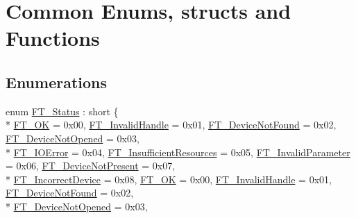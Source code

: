 \hypertarget{group___common}{}\section{Common Enums, structs and Functions}
\label{group___common}
\subsection*{Enumerations}
\begin{DoxyCompactItemize}
\item 
enum \hyperlink{group___common_ga9de42f4b466f017bd6daf4e230259f63}{F\+T\+\_\+\+Status} \+: short \{ \\*
\hyperlink{group___common_gga9de42f4b466f017bd6daf4e230259f63a57771796d33c3f4178130c5daa56b9a3}{F\+T\+\_\+\+OK} = 0x00, 
\hyperlink{group___common_gga9de42f4b466f017bd6daf4e230259f63ac239cf0d929347a453a8c101dc92e807}{F\+T\+\_\+\+Invalid\+Handle} = 0x01, 
\hyperlink{group___common_gga9de42f4b466f017bd6daf4e230259f63ae9964600bb851f34b23a83b24b2e6da2}{F\+T\+\_\+\+Device\+Not\+Found} = 0x02, 
\hyperlink{group___common_gga9de42f4b466f017bd6daf4e230259f63aceb643842b51d1133483c713d15457dd}{F\+T\+\_\+\+Device\+Not\+Opened} = 0x03, 
\\*
\hyperlink{group___common_gga9de42f4b466f017bd6daf4e230259f63a51deb65a356d1b1c0e90f62404efcc29}{F\+T\+\_\+\+I\+O\+Error} = 0x04, 
\hyperlink{group___common_gga9de42f4b466f017bd6daf4e230259f63a6af4fbc8e683431beb65cce312c32fa1}{F\+T\+\_\+\+Insufficient\+Resources} = 0x05, 
\hyperlink{group___common_gga9de42f4b466f017bd6daf4e230259f63af677e4e362188f7700de9148a19f3191}{F\+T\+\_\+\+Invalid\+Parameter} = 0x06, 
\hyperlink{group___common_gga9de42f4b466f017bd6daf4e230259f63afea2827628e7f1d1fda4338df66236a6}{F\+T\+\_\+\+Device\+Not\+Present} = 0x07, 
\\*
\hyperlink{group___common_gga9de42f4b466f017bd6daf4e230259f63aca07e33d55138391799f473adeb00140}{F\+T\+\_\+\+Incorrect\+Device} = 0x08, 
\hyperlink{group___common_gga9de42f4b466f017bd6daf4e230259f63a57771796d33c3f4178130c5daa56b9a3}{F\+T\+\_\+\+OK} = 0x00, 
\hyperlink{group___common_gga9de42f4b466f017bd6daf4e230259f63ac239cf0d929347a453a8c101dc92e807}{F\+T\+\_\+\+Invalid\+Handle} = 0x01, 
\hyperlink{group___common_gga9de42f4b466f017bd6daf4e230259f63ae9964600bb851f34b23a83b24b2e6da2}{F\+T\+\_\+\+Device\+Not\+Found} = 0x02, 
\\*
\hyperlink{group___common_gga9de42f4b466f017bd6daf4e230259f63aceb643842b51d1133483c713d15457dd}{F\+T\+\_\+\+Device\+Not\+Opened} = 0x03, 

\end{DoxyCompactItemize}
